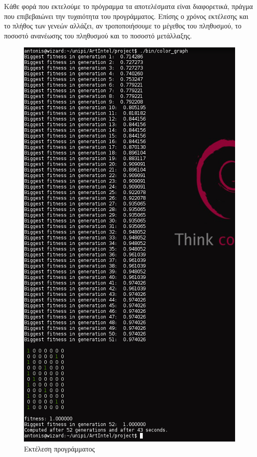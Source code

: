\documentclass{article}
\begin{document}
Κάθε φορά που εκτελούμε το πρόγραμμα τα αποτελέσματα είναι διαφορετικά, πράγμα
που επιβεβαιώνει την τυχαιότητα του προγράμματος. Επίσης ο χρόνος εκτέλεσης και
το πλήθος των γενεών αλλάζει, αν τροποποιήσουμε το μέγεθος του πληθυσμού, το
ποσοστό ανανέωσης του πληθυσμού και το ποσοστό μετάλλαξης.
\begin{figure}[tbh]
\centering
\includegraphics[scale=0.8]{running.png}
\caption{Εκτέλεση προγράμματος}
\label{running}
\end{figure}
\end{document}
